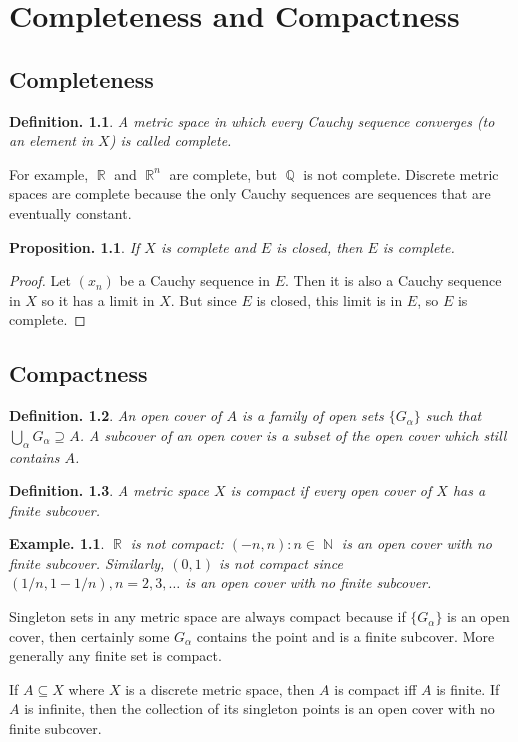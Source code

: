 \documentclass[11pt, a4paper]{memoir}
\DeclareMathOperator{\N}{{\mathbb{N}}}
\DeclareMathOperator{\Q}{{\mathbb{Q}}}
\DeclareMathOperator{\R}{{\mathbb{R}}}
\theoremstyle{change}
\newtheorem{proposition}[theorem]{Proposition.}
\theoremstyle{plain}
\theoremstyle{nonumberplain}
\newtheorem{definition}{Definition.}
\newtheorem{example}{Example.}
\newtheorem{proof}{Proof}
\numberwithin{equation}{section}
\begin{document}
\chapter{Completeness and Compactness}
\section{Completeness}
\begin{definition}
    A metric space in which every Cauchy sequence converges (to an element in $X$) is called \textit{complete}.
\end{definition}
For example, $\R$ and $\R^n$ are complete, but $\Q$ is not complete. Discrete metric spaces are complete because the
only Cauchy sequences are sequences that are eventually constant.
\begin{proposition}
    If $X$ is complete and $E$ is closed, then $E$ is complete.
\end{proposition}
\begin{proof}
    Let $(x_n)$ be a Cauchy sequence in $E$. Then it is also a Cauchy sequence in $X$ so it has a limit in $X$. But since $E$
    is closed, this limit is in $E$, so $E$ is complete.
\end{proof}
\section{Compactness}
\begin{definition}
    An \textit{open cover} of $A$ is a family of open sets $\{G_\alpha\}$ such that $\bigcup_\alpha G_\alpha\supseteq A$.
    A subcover of an open cover is a subset of the open cover which still contains $A$.
\end{definition}
\begin{definition}
    A metric space $X$ is \textit{compact} if every open cover of $X$ has a finite subcover.
\end{definition}
\begin{example}
    $\R$ is not compact: $(-n,n):n\in\N$ is an open cover with no finite subcover. Similarly, $(0,1)$ is not compact
    since $(1/n,1-1/n),n=2,3,\ldots$ is an open cover with no finite subcover.
\end{example}
Singleton sets in any metric space are always compact because if $\{G_\alpha\}$ is an open cover, then certainly
some $G_\alpha$ contains the point and is a finite subcover. More generally any finite set is compact.

If $A\subseteq X$ where $X$ is a discrete metric space, then $A$ is compact iff $A$ is finite. If $A$ is infinite, then
the collection of its singleton points is an open cover with no finite subcover.
\end{document}
